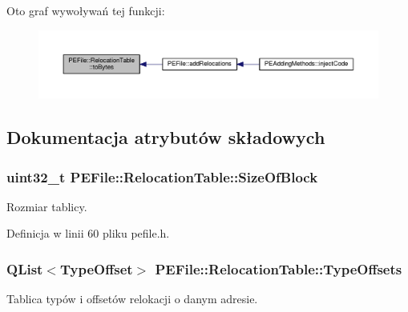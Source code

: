 Oto graf wywoływań tej funkcji\-:
\nopagebreak
\begin{figure}[H]
\begin{center}
\leavevmode
\includegraphics[width=350pt]{struct_p_e_file_1_1_relocation_table_ab4ffcdaf0bb39d4042dcab51436300fa_icgraph}
\end{center}
\end{figure}




\subsection{Dokumentacja atrybutów składowych}
\hypertarget{struct_p_e_file_1_1_relocation_table_ae28c64748e1a56f5ac2c30ca49c0775c}{
\subsubsection[{Size\-Of\-Block}]{\setlength{\rightskip}{0pt plus 5cm}uint32\-\_\-t P\-E\-File\-::\-Relocation\-Table\-::\-Size\-Of\-Block}}\label{struct_p_e_file_1_1_relocation_table_ae28c64748e1a56f5ac2c30ca49c0775c}


Rozmiar tablicy. 



Definicja w linii 60 pliku pefile.\-h.

\hypertarget{struct_p_e_file_1_1_relocation_table_a28a0ecf5477d11bbdb1fabc2fce24e64}{
\subsubsection[{Type\-Offsets}]{\setlength{\rightskip}{0pt plus 5cm}Q\-List$<${\bf Type\-Offset}$>$ P\-E\-File\-::\-Relocation\-Table\-::\-Type\-Offsets}}\label{struct_p_e_file_1_1_relocation_table_a28a0ecf5477d11bbdb1fabc2fce24e64}


Tablica typów i offsetów relokacji o danym adresie. 



